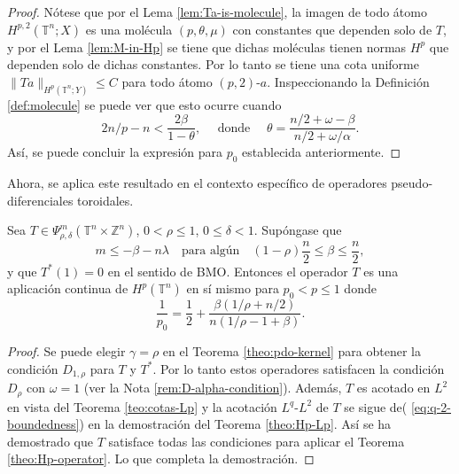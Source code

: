 \begin{proof}
	Nótese que por el Lema \ref{lem:Ta-is-molecule}, la imagen de todo átomo $H^{p,2}(\mathbb{T}^n;X)$ es una molécula $(p, \theta,\mu)$ con constantes que dependen solo de $T$, y por el Lema \ref{lem:M-in-Hp} se tiene que dichas moléculas tienen normas $H^p$ que dependen solo de dichas constantes. Por lo tanto se tiene una cota uniforme $\|Ta\|_{H^p(\mathbb{T}^n;Y)}\leq C$ para todo átomo $(p,2)$-$a$. Inspeccionando la Definición \ref{def:molecule} se puede ver que esto ocurre cuando 
	\begin{equation*}
		2n/p -n < \frac{2\beta}{1-\theta}, \quad \text{ donde } \quad \theta = \frac{n/2+\omega-\beta}{n/2+\omega/\alpha}.
	\end{equation*}
	Así, se puede concluir la expresión para $p_0$ establecida anteriormente.
\end{proof}
Ahora, se aplica este resultado en el contexto específico de operadores pseudo-diferenciales toroidales.
\begin{theorem}
	Sea $T\in \Psi^m_{\rho,\delta}(\mathbb{T}^n\times\mathbb{Z}^n)$, $0<\rho\leq1$, $0\leq\delta<1$. Supóngase que
	\begin{equation}
		m\leq-\beta-n\lambda \quad  \text{para algún} \quad (1-\rho)\frac{n}{2}\leq\beta\leq \frac{n}{2}, 
	\end{equation}
	y que $T^*(1)=0$ en el sentido de BMO. Entonces el operador $T$ es una aplicación continua de $H^p(\mathbb{T}^n)$ en sí mismo para $p_0<p\leq1$ donde 
	\begin{equation}
		\frac{1}{p_0} = \frac{1}{2}+\frac{\beta(1/\rho + n/2)}{n(1/\rho-1+\beta)}.
	\end{equation}
\end{theorem}
\begin{proof}
	Se puede elegir $\gamma =\rho$ en el Teorema \ref{theo:pdo-kernel} para obtener la condición $D_{1,\rho}$ para $T$ y $T^*$. Por lo tanto estos operadores satisfacen la condición $D_\rho$  con $\omega=1$ (ver la Nota \ref{rem:D-alpha-condition}). Además, $T$ es acotado en $L^2$ en vista del Teorema \ref{teo:cotas-Lp} y la acotación $L^q$-$L^2$ de $T$ se sigue de( \ref{eq:q-2-boundedness}) en la demostración del Teorema \ref{theo:Hp-Lp}. Así se ha demostrado que $T$ satisface todas las condiciones para aplicar el Teorema \ref{theo:Hp-operator}. Lo que completa la demostración.
\end{proof}

